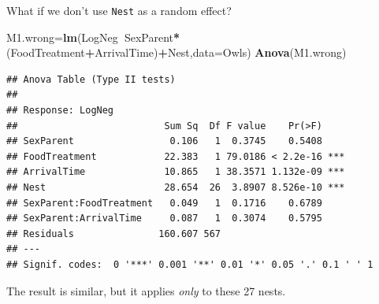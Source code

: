 \documentclass[
  ignorenonframetext,
]{beamer}
\newenvironment{Shaded}{\begin{snugshade}}{\end{snugshade}}
\newcommand{\DataTypeTok}[1]{\textcolor[rgb]{0.13,0.29,0.53}{#1}}
\newcommand{\KeywordTok}[1]{\textcolor[rgb]{0.13,0.29,0.53}{\textbf{#1}}}
\newcommand{\NormalTok}[1]{#1}
\newcommand{\OperatorTok}[1]{\textcolor[rgb]{0.81,0.36,0.00}{\textbf{#1}}}
\begin{document}
\begin{frame}[fragile]{What if we don't use \texttt{Nest} as a random
effect?}
\protect\hypertarget{what-if-we-dont-use-nest-as-a-random-effect}{}

\scriptsize

\begin{Shaded}
\begin{Highlighting}[]
\NormalTok{M1.wrong=}\KeywordTok{lm}\NormalTok{(LogNeg}\OperatorTok{~}\NormalTok{SexParent}\OperatorTok{*}\NormalTok{(FoodTreatment}\OperatorTok{+}\NormalTok{ArrivalTime)}\OperatorTok{+}\NormalTok{Nest,}\DataTypeTok{data=}\NormalTok{Owls)}
\KeywordTok{Anova}\NormalTok{(M1.wrong)}
\end{Highlighting}
\end{Shaded}

\begin{verbatim}
## Anova Table (Type II tests)
## 
## Response: LogNeg
##                          Sum Sq  Df F value    Pr(>F)    
## SexParent                 0.106   1  0.3745    0.5408    
## FoodTreatment            22.383   1 79.0186 < 2.2e-16 ***
## ArrivalTime              10.865   1 38.3571 1.132e-09 ***
## Nest                     28.654  26  3.8907 8.526e-10 ***
## SexParent:FoodTreatment   0.049   1  0.1716    0.6789    
## SexParent:ArrivalTime     0.087   1  0.3074    0.5795    
## Residuals               160.607 567                      
## ---
## Signif. codes:  0 '***' 0.001 '**' 0.01 '*' 0.05 '.' 0.1 ' ' 1
\end{verbatim}

\normalsize

The result is similar, but it applies \emph{only} to these 27 nests.

\end{frame}
\end{document}
